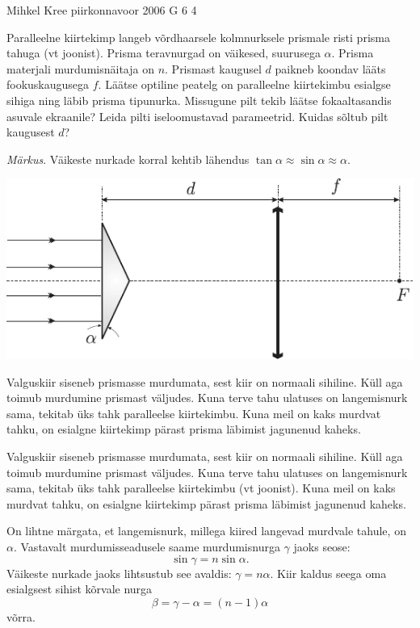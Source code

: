 {Mihkel Kree} %
{piirkonnavoor} %
{2006} %
{G 6} %
{4} %
{
\ifStatement
Paralleelne kiirtekimp langeb võrdhaarsele kolmnurksele prismale risti prisma tahuga (vt joonist). Prisma teravnurgad on väikesed, suurusega $\alpha$. Prisma materjali murdumisnäitaja on $n$. Prismast kaugusel $d$ paikneb koondav lääts fookuskaugusega $f$. Läätse optiline peatelg on paralleelne kiirtekimbu esialgse sihiga ning läbib prisma tipunurka. Missugune pilt tekib läätse fokaaltasandis asuvale ekraanile? Leida pilti iseloomustavad parameetrid. Kuidas sõltub pilt kaugusest $d$? 

\emph{Märkus}. Väikeste nurkade korral kehtib lähendus $\tan \alpha \approx \sin \alpha \approx \alpha$.

\begin{center}
	\includegraphics[width=\linewidth]{2006-v2g-06-yl}
\end{center}
\fi


\ifHint
Valguskiir siseneb prismasse murdumata, sest kiir on normaali sihiline. Küll aga toimub murdumine prismast väljudes. Kuna terve tahu ulatuses on langemisnurk sama, tekitab üks tahk paralleelse kiirtekimbu. Kuna meil on kaks murdvat tahku, on esialgne kiirtekimp pärast prisma läbimist jagunenud kaheks.
\fi


\ifSolution
Valguskiir siseneb prismasse murdumata, sest kiir on normaali sihiline. Küll aga toimub murdumine prismast väljudes. Kuna terve tahu ulatuses on langemisnurk sama, tekitab üks tahk paralleelse kiirtekimbu (vt joonist). Kuna meil on kaks murdvat tahku, on esialgne kiirtekimp pärast prisma läbimist jagunenud kaheks.

On lihtne märgata, et langemisnurk, millega kiired langevad murdvale tahule, on $\alpha$. 
Vastavalt murdumisseadusele saame murdumisnurga $\gamma$ jaoks seose:
\[
\sin \gamma = n \sin \alpha.
\]
Väikeste nurkade jaoks lihtsustub see avaldis: $\gamma = n\alpha$. Kiir kaldus seega oma esialgsest sihist kõrvale nurga
\[
\beta = \gamma - \alpha = (n - 1) \alpha
\]
võrra. 

}
